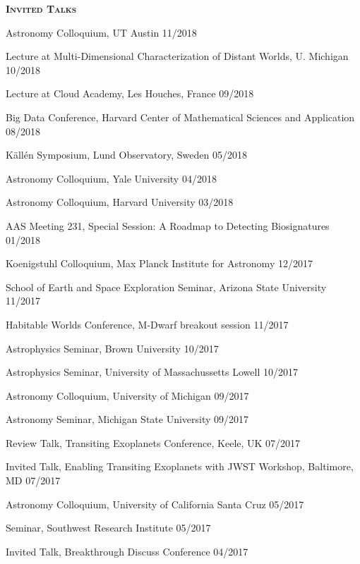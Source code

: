 \documentclass[12pt,letterpaper]{article}
\begin{document}
\vspace{3mm}



\vspace{5mm}
\textbf{\textsc{Invited Talks}} 
\begin{compactitem}[]
\item {Astronomy Colloquium, UT Austin \hfill 11/2018}
\item {Lecture at Multi-Dimensional Characterization of Distant Worlds, U. Michigan \hfill 10/2018}
\item {Lecture at Cloud Academy, Les Houches, France \hfill 09/2018} 
\item {Big Data Conference, Harvard Center of Mathematical Sciences and Application \hfill 08/2018}
\item {K\"{a}ll\'{e}n Symposium, Lund Observatory, Sweden \hfill 05/2018}
\item {Astronomy Colloquium, Yale University \hfill 04/2018}
\item{Astronomy Colloquium, Harvard University \hfill 03/2018}
\item {AAS Meeting 231, Special Session: A Roadmap to Detecting Biosignatures \hfill 01/2018}
\item {Koenigstuhl Colloquium, Max Planck Institute for Astronomy \hfill 12/2017}
\item {School of Earth and Space Exploration Seminar, Arizona State University \hfill 11/2017}
\item {Habitable Worlds Conference, M-Dwarf breakout session \hfill 11/2017}
\item {Astrophysics Seminar, Brown University \hfill 10/2017}
\item {Astrophysics Seminar, University of Massachussetts Lowell \hfill 10/2017}
\item {Astronomy Colloquium, University of Michigan \hfill 09/2017}
\item {Astronomy Seminar, Michigan State University \hfill 09/2017}
\item {Review Talk, Transiting Exoplanets Conference, Keele, UK \hfill 07/2017}
\item {Invited Talk, Enabling Transiting Exoplanets with JWST Workshop, Baltimore, MD \hfill 07/2017}
\item {Astronomy Colloquium, University of California Santa Cruz \hfill 05/2017}
\item {Seminar, Southwest Research Institute \hfill 05/2017}
\item {Invited Talk, Breakthrough Discuss Conference \hfill 04/2017}

\end{compactitem}
\end{document}
